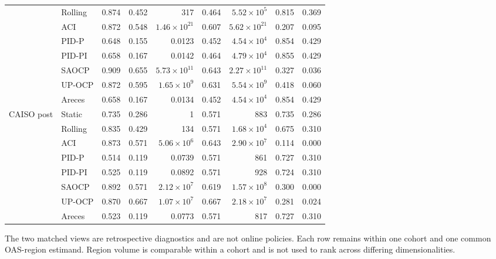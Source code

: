 \begin{table}[!t]
\begin{tabular}{llrrr|rr|rr}
 & Rolling & 0.874 & 0.452 & 317 & 0.464 & $5.52\times10^{5}$ & 0.815 & 0.369 \\
 & ACI & 0.872 & 0.548 & $1.46\times10^{21}$ & 0.607 & $5.62\times10^{21}$ & 0.207 & 0.095 \\
 & PID-P & 0.648 & 0.155 & 0.0123 & 0.452 & $4.54\times10^{4}$ & 0.854 & 0.429 \\
 & PID-PI & 0.658 & 0.167 & 0.0142 & 0.464 & $4.79\times10^{4}$ & 0.855 & 0.429 \\
 & SAOCP & 0.909 & 0.655 & $5.73\times10^{11}$ & 0.643 & $2.27\times10^{11}$ & 0.327 & 0.036 \\
 & UP-OCP & 0.872 & 0.595 & $1.65\times10^{9}$ & 0.631 & $5.54\times10^{9}$ & 0.418 & 0.060 \\
 & Areces & 0.658 & 0.167 & 0.0134 & 0.452 & $4.54\times10^{4}$ & 0.854 & 0.429 \\
\addlinespace[2pt]
CAISO post & Static & 0.735 & 0.286 & 1 & 0.571 & 883 & 0.735 & 0.286 \\
 & Rolling & 0.835 & 0.429 & 134 & 0.571 & $1.68\times10^{4}$ & 0.675 & 0.310 \\
 & ACI & 0.873 & 0.571 & $5.06\times10^{6}$ & 0.643 & $2.90\times10^{7}$ & 0.114 & 0.000 \\
 & PID-P & 0.514 & 0.119 & 0.0739 & 0.571 & 861 & 0.727 & 0.310 \\
 & PID-PI & 0.525 & 0.119 & 0.0892 & 0.571 & 928 & 0.724 & 0.310 \\
 & SAOCP & 0.892 & 0.571 & $2.12\times10^{7}$ & 0.619 & $1.57\times10^{8}$ & 0.300 & 0.000 \\
 & UP-OCP & 0.870 & 0.667 & $1.07\times10^{7}$ & 0.667 & $2.18\times10^{7}$ & 0.281 & 0.024 \\
 & Areces & 0.523 & 0.119 & 0.0773 & 0.571 & 817 & 0.727 & 0.310 \\
\bottomrule
\end{tabular}
\par\footnotesize The two matched views are retrospective diagnostics and are not online policies. Each row remains within one cohort and one common OAS-region estimand. Region volume is comparable within a cohort and is not used to rank across differing dimensionalities.
\end{table}
